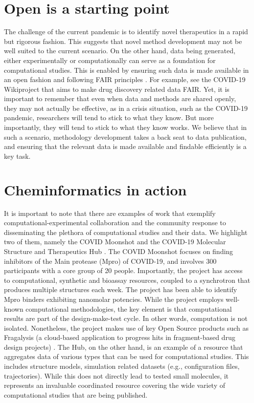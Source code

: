\documentclass{bmcart}
\begin{document}
\section*{Open is a starting point}

The challenge of the current pandemic is to identify novel
therapeutics in a rapid but rigorous fashion. This suggests that novel
method development may not be well suited to the current scenario. On
the other hand, data being generated, either experimentally or
computationally can serve as a foundation for computational
studies. This is enabled by ensuring such data is made available in an
open fashion and following FAIR principles \cite{fair-1, fair-2}. For
example, see the COVID-19 Wikiproject \cite{wikidata} that aims to
make drug discovery related data FAIR. Yet, it is important to
remember that even when data and methods are shared openly, they may
not actually be effective, as in a crisis situation, such as the
COVID-19 pandemic, researchers will tend to stick to what they know.
But more importantly, they will tend to stick to what they know
works. We believe that in such a scenario, methodology development
takes a back seat to data publication, and ensuring that the relevant
data is made available and findable efficiently is a key task.

\section*{Cheminformatics in action}
\label{sec:chem-acti}

It is important to note that there are examples of work that exemplify
computational-experimental collaboration and the community response to
disseminating the plethora of computational studies and their data. We
highlight two of them, namely the COVID Moonshot \cite{moonshot} and
the COVID-19 Molecular Structure and Therapeutics Hub
\cite{molssi}. The COVID Moonshot focuses on finding inhibitors of the
Main protease (Mpro) of COVID-19, and involves 300 participants with a
core group of 20 people. Importantly, the project has access to
computational, synthetic and bioassay resources, coupled to a
synchrotron that produces multiple structures each week. The project
has been able to identify Mpro binders exhibiting nanomolar
potencies. While the project employs well-known computational
methodologies, the key element is that computational results are part
of the design-make-test cycle. In other words, computation is not
isolated. Nonetheless, the project makes use of key Open Source
products such as Fragalysis (a cloud-based application to progress
hits in fragment-based drug design projects) \cite{fragalysis}. The
Hub, on the other hand, is an example of a resource that aggregates
data of various types that can be used for computational studies. This
includes structure models, simulation related datasets (e.g.,
configuration files, trajectories). While this does not directly lead
to tested small molecules, it represents an invaluable coordinated
resource covering the wide variety of computational studies that are
being published.
\end{document}
